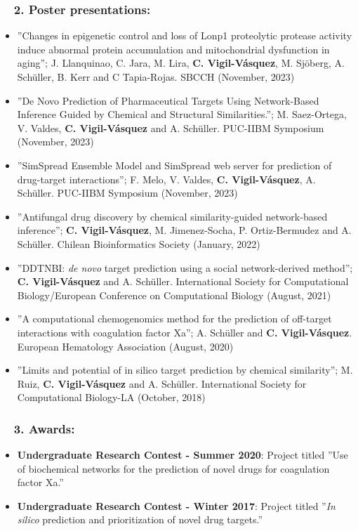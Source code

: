 \documentclass[letter,20pt]{article}
\newcommand{\resumeItem}[2]{
  \item\small{
    \textbf{#1}{: #2 \vspace{-2pt}}
  }
}
\newcommand{\resumeItemWithoutTitle}[1]{
  \item\small{
    {\vspace{-2pt}}
  }
}
\newcommand{\resumeSubItem}[2]{\resumeItem{#1}{#2}\vspace{-3pt}}
\newcommand{\resumeSubHeadingListStart}{\begin{itemize}[leftmargin=*]}
\newcommand{\resumeSubHeadingListEnd}{\end{itemize}}
\begin{document}
\subsubsection*{~~2. Poster presentations:}
\resumeSubHeadingListStart
\resumeItemWithoutTitle{}{''Changes in epigenetic control and loss of Lonp1 proteolytic protease activity induce abnormal protein accumulation and mitochondrial dysfunction in aging''; J. Llanquinao, C. Jara, M. Lira, \textbf{C. Vigil-Vásquez}, M. Sjöberg, A. Schüller, B. Kerr and C Tapia-Rojas. SBCCH (November, 2023)}
\resumeItemWithoutTitle{}{''De Novo Prediction of Pharmaceutical Targets Using Network-Based Inference Guided by Chemical and Structural Similarities.''; M. Saez-Ortega, V. Valdes, \textbf{C. Vigil-Vásquez} and A. Schüller. PUC-IIBM Symposium (November, 2023)}
\resumeItemWithoutTitle{}{''SimSpread Ensemble Model and SimSpread web server for prediction of drug-target interactions''; F. Melo, V. Valdes, \textbf{C. Vigil-Vásquez}, A. Schüller. PUC-IIBM Symposium (November, 2023)}
\resumeItemWithoutTitle{}{''Antifungal drug discovery by chemical similarity-guided network-based inference''; \textbf{C. Vigil-Vásquez}, M. Jimenez-Socha, P. Ortiz-Bermudez and A. Schüller. Chilean Bioinformatics Society (January, 2022)}
\resumeItemWithoutTitle{}{''DDTNBI: \textit{de novo} target prediction using a social network-derived method''; \textbf{C. Vigil-Vásquez} and A. Schüller. International Society for Computational Biology/European Conference on Computational Biology (August, 2021)}
\resumeItemWithoutTitle{}{''A computational chemogenomics method for the prediction of off-target interactions with coagulation factor Xa''; A. Schüller and \textbf{C. Vigil-Vásquez}. European Hematology Association (August, 2020)}
\resumeItemWithoutTitle{}{''Limits and potential of in silico target prediction by chemical similarity'';  M. Ruiz, \textbf{C. Vigil-Vásquez} and A. Schüller. International Society for Computational Biology-LA (October, 2018)}
\resumeSubHeadingListEnd
\vspace{-5pt}

\subsubsection*{~~3. Awards:}
\resumeSubHeadingListStart
	\resumeSubItem{Undergraduate Research Contest - Summer 2020}{Project titled ''Use of biochemical networks for the prediction of novel drugs for coagulation factor Xa.''}
	\resumeSubItem{Undergraduate Research Contest - Winter 2017}{Project titled ''\textit{In silico} prediction and prioritization of novel drug targets.''}
\vspace{2pt}
\resumeSubHeadingListEnd
\end{document}
